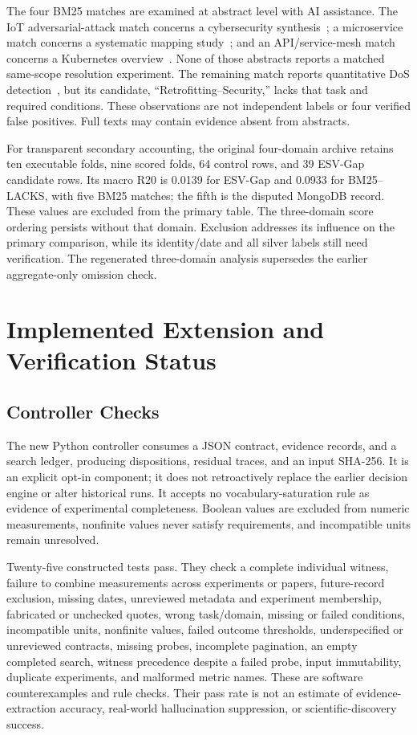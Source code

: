 \documentclass[runningheads]{llncs}
\begin{document}
The four BM25 matches are examined at abstract level with AI assistance. The IoT adversarial-attack match concerns a cybersecurity synthesis~\cite{jayawardena2026}; a microservice match concerns a systematic mapping study~\cite{rahaman2023}; and an API/service-mesh match concerns a Kubernetes overview~\cite{kampa2024}. None of those abstracts reports a matched same-scope resolution experiment. The remaining match reports quantitative DoS detection~\cite{olaya2024}, but its candidate, ``Retrofitting--Security,'' lacks that task and required conditions. These observations are not independent labels or four verified false positives. Full texts may contain evidence absent from abstracts.

For transparent secondary accounting, the original four-domain archive retains ten executable folds, nine scored folds, 64 control rows, and 39 ESV-Gap candidate rows. Its macro R20 is 0.0139 for ESV-Gap and 0.0933 for BM25--LACKS, with five BM25 matches; the fifth is the disputed MongoDB record. These values are excluded from the primary table. The three-domain score ordering persists without that domain. Exclusion addresses its influence on the primary comparison, while its identity/date and all silver labels still need verification. The regenerated three-domain analysis supersedes the earlier aggregate-only omission check.

\section{Implemented Extension and Verification Status}
\subsection{Controller Checks}
The new Python controller consumes a JSON contract, evidence records, and a search ledger, producing dispositions, residual traces, and an input SHA-256. It is an explicit opt-in component; it does not retroactively replace the earlier decision engine or alter historical runs. It accepts no vocabulary-saturation rule as evidence of experimental completeness. Boolean values are excluded from numeric measurements, nonfinite values never satisfy requirements, and incompatible units remain unresolved.

Twenty-five constructed tests pass. They check a complete individual witness, failure to combine measurements across experiments or papers, future-record exclusion, missing dates, unreviewed metadata and experiment membership, fabricated or unchecked quotes, wrong task/domain, missing or failed conditions, incompatible units, nonfinite values, failed outcome thresholds, underspecified or unreviewed contracts, missing probes, incomplete pagination, an empty completed search, witness precedence despite a failed probe, input immutability, duplicate experiments, and malformed metric names. These are software counterexamples and rule checks. Their pass rate is not an estimate of evidence-extraction accuracy, real-world hallucination suppression, or scientific-discovery success.
\end{document}
